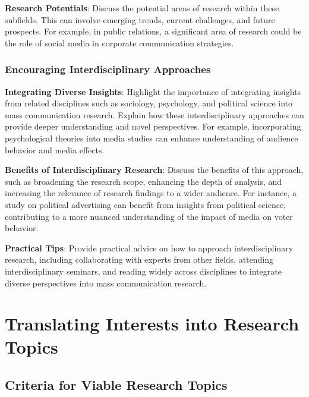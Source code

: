 \documentclass[
]{book}
\begin{document}
\textbf{Research Potentials}: Discuss the potential areas of research within these subfields. This can involve emerging trends, current challenges, and future prospects. For example, in public relations, a significant area of research could be the role of social media in corporate communication strategies.

\hypertarget{encouraging-interdisciplinary-approaches}{%
\subsubsection*{Encouraging Interdisciplinary Approaches}\label{encouraging-interdisciplinary-approaches}}

\textbf{Integrating Diverse Insights}: Highlight the importance of integrating insights from related disciplines such as sociology, psychology, and political science into mass communication research. Explain how these interdisciplinary approaches can provide deeper understanding and novel perspectives. For example, incorporating psychological theories into media studies can enhance understanding of audience behavior and media effects.

\textbf{Benefits of Interdisciplinary Research}: Discuss the benefits of this approach, such as broadening the research scope, enhancing the depth of analysis, and increasing the relevance of research findings to a wider audience. For instance, a study on political advertising can benefit from insights from political science, contributing to a more nuanced understanding of the impact of media on voter behavior.

\textbf{Practical Tips}: Provide practical advice on how to approach interdisciplinary research, including collaborating with experts from other fields, attending interdisciplinary seminars, and reading widely across disciplines to integrate diverse perspectives into mass communication research.

\hypertarget{translating-interests-into-research-topics}{%
\section*{Translating Interests into Research Topics}\label{translating-interests-into-research-topics}}

\hypertarget{criteria-for-viable-research-topics}{%
\subsection*{Criteria for Viable Research Topics}\label{criteria-for-viable-research-topics}}
\end{document}
